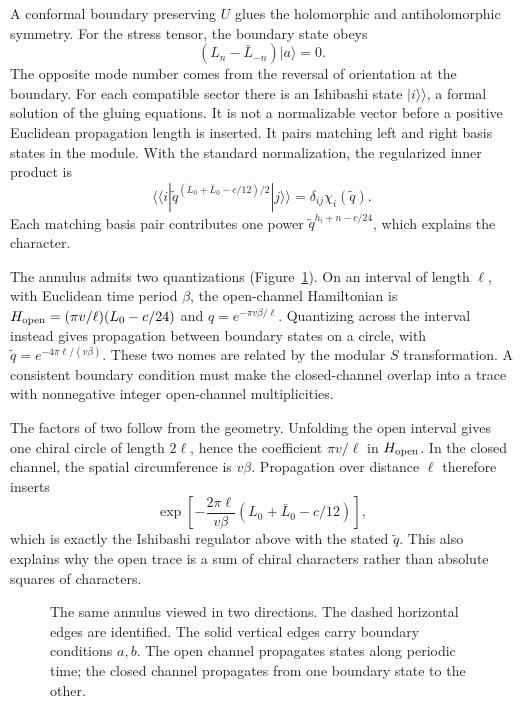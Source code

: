A conformal boundary preserving $U$ glues the holomorphic and
antiholomorphic symmetry. For the stress tensor, the boundary
state obeys
\[
 (L_n-\bar L_{-n})|a\rangle=0.
\]
The opposite mode number comes from the reversal of orientation
at the boundary. For each compatible sector there is an
Ishibashi state $|i\rangle\!\rangle$, a formal solution of the
gluing equations. It is not a normalizable vector before a
positive Euclidean propagation length is inserted. It pairs
matching left and right basis states in the module. With the
standard normalization, the regularized inner product is
\[
 \langle\!\langle i|
 \tilde q^{(L_0+\bar L_0-c/12)/2}
 |j\rangle\!\rangle=\delta_{ij}\chi_i(\tilde q).
\]
Each matching basis pair contributes one power
$\tilde q^{h_i+n-c/24}$, which explains the character.

The annulus admits two quantizations
(Figure~\ref{fig:defect-annulus-channels}).
On an interval of length $\ell$, with Euclidean time period
$\beta$, the open-channel Hamiltonian is
$H_{\rm open}=(\pi v/\ell)(L_0-c/24)$ and
$q=e^{-\pi v\beta/\ell}$. Quantizing across the interval
instead gives propagation between boundary states on a circle,
with $\tilde q=e^{-4\pi\ell/(v\beta)}$. These two nomes are
related by the modular $S$ transformation. A consistent boundary
condition must make the closed-channel overlap into a trace with
nonnegative integer open-channel multiplicities.

The factors of two follow from the geometry. Unfolding the open
interval gives one chiral circle of length $2\ell$, hence the
coefficient $\pi v/\ell$ in $H_{\rm open}$. In the closed channel,
the spatial circumference is $v\beta$. Propagation over distance
$\ell$ therefore inserts
\[
 \exp\!\left[-\frac{2\pi\ell}{v\beta}
                   (L_0+\bar L_0-c/12)\right],
\]
which is exactly the Ishibashi regulator above with the stated
$\tilde q$. This also explains why the open trace is a sum of chiral
characters rather than absolute squares of characters.

\begin{figure}[htbp]
\centering

\caption{The same annulus viewed in two directions. The dashed
horizontal edges are identified. The solid vertical edges carry
boundary conditions $a,b$. The open channel propagates states
along periodic time; the closed channel propagates from one
boundary state to the other.}
\label{fig:defect-annulus-channels}
\end{figure}

